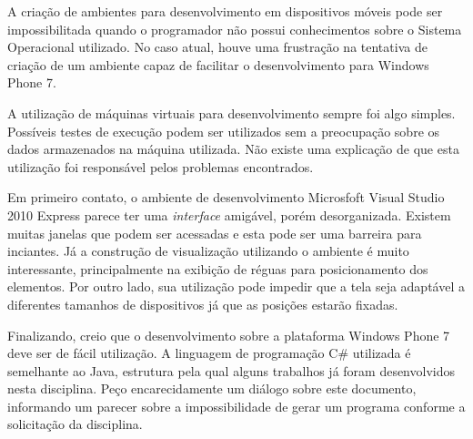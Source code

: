 \documentclass{article}
\begin{document}
A criação de ambientes para desenvolvimento em dispositivos móveis pode ser
impossibilitada quando o programador não possui conhecimentos sobre o Sistema
Operacional utilizado. No caso atual, houve uma frustração na tentativa de
criação de um ambiente capaz de facilitar o desenvolvimento para Windows Phone
7.

A utilização de máquinas virtuais para desenvolvimento sempre foi algo simples.
Possíveis testes de execução podem ser utilizados sem a preocupação sobre os
dados armazenados na máquina utilizada. Não existe uma explicação de que esta
utilização foi responsável pelos problemas encontrados.

Em primeiro contato, o ambiente de desenvolvimento Microsfoft Visual Studio 2010
Express parece ter uma \textit{interface} amigável, porém desorganizada. Existem
muitas janelas que podem ser acessadas e esta pode ser uma barreira para
inciantes. Já a construção de visualização utilizando o ambiente é muito
interessante, principalmente na exibição de réguas para posicionamento dos
elementos. Por outro lado, sua utilização pode impedir que a tela seja adaptável
a diferentes tamanhos de dispositivos já que as posições estarão fixadas.

Finalizando, creio que o desenvolvimento sobre a plataforma Windows Phone 7 deve
ser de fácil utilização. A linguagem de programação C\# utilizada é semelhante
ao Java, estrutura pela qual alguns trabalhos já foram desenvolvidos nesta
disciplina. Peço encarecidamente um diálogo sobre este documento, informando um
parecer sobre a impossibilidade de gerar um programa conforme a solicitação da
disciplina.
\end{document}
